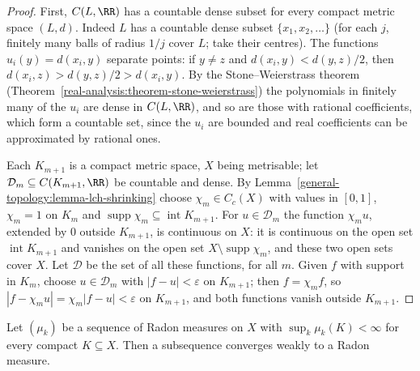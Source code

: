 \begin{proof}
First, $C(L, \RR)$ has a countable dense subset for every compact metric space $(L, d)$. Indeed $L$ has a countable dense subset $\{x_1, x_2, \ldots\}$ (for each $j$, finitely many balls of radius $1/j$
cover $L$; take their centres). The functions $u_i(y) = d(x_i, y)$ separate points: if $y \neq z$ and $d(x_i, y) < d(y, z)/2$, then $d(x_i, z) > d(y, z)/2 > d(x_i, y)$. By the Stone--Weierstrass theorem
(Theorem~\ref{real-analysis:theorem-stone-weierstrass}) the polynomials in finitely many of the $u_i$ are dense in $C(L, \RR)$, and so are those with rational coefficients, which form a countable set, since
the $u_i$ are bounded and real coefficients can be approximated by rational ones.

Each $K_{m+1}$ is a compact metric space, $X$ being metrisable; let $\mathcal{D}_m \subseteq C(K_{m+1}, \RR)$ be countable and dense. By Lemma~\ref{general-topology:lemma-lch-shrinking} choose
$\chi_m \in C_c(X)$ with values in $[0, 1]$, $\chi_m = 1$ on $K_m$ and $\operatorname{supp}\chi_m \subseteq \operatorname{int}K_{m+1}$. For $u \in \mathcal{D}_m$ the function $\chi_mu$, extended by $0$
outside $K_{m+1}$, is continuous on $X$: it is continuous on the open set $\operatorname{int}K_{m+1}$ and vanishes on the open set $X \setminus \operatorname{supp}\chi_m$, and these two open sets cover $X$.
Let $\mathcal{D}$ be the set of all these functions, for all $m$. Given $f$ with support in $K_m$, choose $u \in \mathcal{D}_m$ with $|f - u| < \varepsilon$ on $K_{m+1}$; then $f = \chi_mf$, so
$|f - \chi_mu| = \chi_m|f - u| < \varepsilon$ on $K_{m+1}$, and both functions vanish outside $K_{m+1}$.
\end{proof}

\begin{theorem}\label{radon-measures:theorem-weak-compactness}
Let $(\mu_k)$ be a sequence of Radon measures on $X$ with $\sup_k\mu_k(K) < \infty$ for every compact $K \subseteq X$. Then a subsequence converges weakly to a Radon measure.
\end{theorem}

